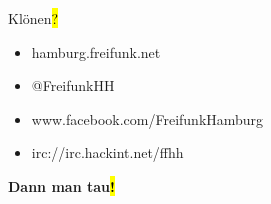 \documentclass[t]{beamer}
\begin{document}
%
%

\begin{frame}{Klönen\hl{?}}
    \begin{itemize}
        \item hamburg.freifunk.net
        \item @FreifunkHH
        \item www.facebook.com/FreifunkHamburg
        \item irc://irc.hackint.net/ffhh
    \end{itemize}
\end{frame}

\begin{frame}{}
    \vspace{1.6cm}
    \centering 
    \vspace{0.8cm}

    {\Huge\bf Dann man tau\hl{!}}
\end{frame}
\end{document}
